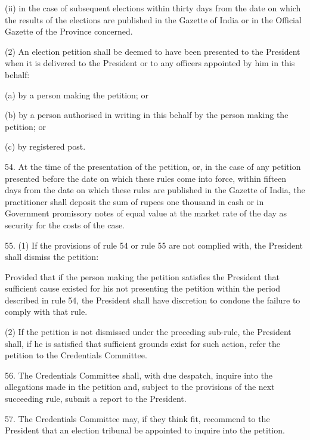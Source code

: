 (ii) in the case of subsequent elections within thirty days from the date on which the results of the elections are published in the Gazette of India or in the Official Gazette of the Province concerned.



(2) An election petition shall be deemed to have been presented to the President when it is delivered to the President or to any officers appointed by him in this behalf:



(a) by a person making the petition; or

(b) by a person authorised in writing in this behalf by the person making the petition; or

(c) by registered post.



54. At the time of the presentation of the petition, or, in the case of any petition presented before the date on which these rules come into force, within fifteen days from the date on which these rules are published in the Gazette of India, the practitioner shall deposit the sum of rupees one thousand in cash or in Government promissory notes of equal value at the market rate of the day as security for the costs of the case.



55. (1) If the provisions of rule 54 or rule 55 are not complied with, the President shall dismiss the petition:



Provided that if the person making the petition satisfies the President that sufficient cause existed for his not presenting the petition within the period described in rule 54, the President shall have discretion to condone the failure to comply with that rule.

(2) If the petition is not dismissed under the preceding sub-rule, the President shall, if he is satisfied that sufficient grounds exist for such action, refer the petition to the Credentials Committee.



56. The Credentials Committee shall, with due despatch, inquire into the allegations made in the petition and, subject to the provisions of the next succeeding rule, submit a report to the President.



57. The Credentials Committee may, if they think fit, recommend to the President that an election tribunal be appointed to inquire into the petition.



